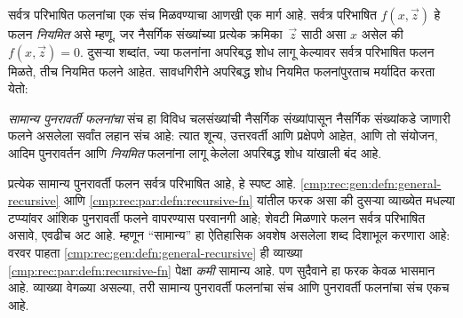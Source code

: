 सर्वत्र परिभाषित फलनांचा एक संच मिळवण्याचा आणखी एक मार्ग आहे.
सर्वत्र परिभाषित $f(x,\vec z)$ हे फलन \emph{नियमित} असे म्हणू, जर
नैसर्गिक संख्यांच्या प्रत्येक क्रमिका~$\vec z$ साठी असा $x$ असेल की
$f(x,\vec z) = 0$. दुसऱ्या शब्दांत, ज्या फलनांना अपरिबद्ध शोध लागू
केल्यावर सर्वत्र परिभाषित फलन मिळते, तीच नियमित फलने आहेत.
सावधगिरीने अपरिबद्ध शोध नियमित फलनांपुरताच मर्यादित करता येतो:

\begin{defn}
\label{cmp:rec:gen:defn:general-recursive}
\emph{सामान्य पुनरावर्ती फलनांचा} संच हा विविध चलसंख्यांची नैसर्गिक
संख्यांपासून नैसर्गिक संख्यांकडे जाणारी फलने असलेला सर्वांत लहान संच
आहे: त्यात शून्य, उत्तरवर्ती आणि प्रक्षेपणे आहेत, आणि तो संयोजन, आदिम
पुनरावर्तन आणि \emph{नियमित} फलनांना लागू केलेला अपरिबद्ध शोध यांखाली
बंद आहे.
\end{defn}

प्रत्येक सामान्य पुनरावर्ती फलन सर्वत्र परिभाषित आहे, हे स्पष्ट आहे.
\ref{cmp:rec:gen:defn:general-recursive} आणि \ref{cmp:rec:par:defn:recursive-fn}
यांतील फरक असा की दुसऱ्या व्याख्येत मधल्या टप्प्यांवर आंशिक पुनरावर्ती
फलने वापरण्यास परवानगी आहे; शेवटी मिळणारे फलन सर्वत्र परिभाषित असावे,
एवढीच अट आहे. म्हणून ``सामान्य'' हा ऐतिहासिक अवशेष असलेला शब्द
दिशाभूल करणारा आहे: वरवर पाहता \ref{cmp:rec:gen:defn:general-recursive} ही
व्याख्या \ref{cmp:rec:par:defn:recursive-fn} पेक्षा \emph{कमी} सामान्य
आहे. पण सुदैवाने हा फरक केवळ भासमान आहे. व्याख्या वेगळ्या असल्या,
तरी सामान्य पुनरावर्ती फलनांचा संच आणि पुनरावर्ती फलनांचा संच एकच आहे.




